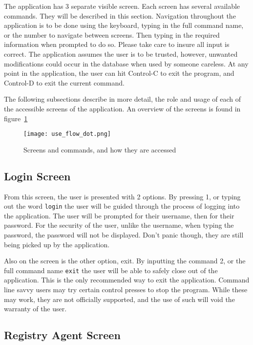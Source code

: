 The application has 3 separate visible screen. Each screen has several
available commands. They will be described in this section. Navigation
throughout the application is to be done using the keyboard, typing in the full
command name, or the number to navigate between screens. Then typing in the
required information when prompted to do so. Please take care to insure all
input is correct. The application assumes the user is to be trusted, however,
unwanted modifications could occur in the database when used by someone
careless. At any point in the application, the user can hit Control-C to exit
the program, and Control-D to exit the current command.

The following subsections describe in more detail, the role and usage of each
of the accessible screens of the application. An overview of the screens is found in figure~\ref{fig:use_flow}

\begin{figure}
    \centering
    \texttt{[image: use\_flow\_dot.png]}
    \caption{Screens and commands, and how they are accessed}\label{fig:use_flow}
\end{figure}

\subsection{Login Screen}

From this screen, the user is presented with 2 options. By pressing 1, or
typing out the word \verb|login| the user will be guided through the process of
logging into the application. The user will be prompted for their username,
then for their password. For the security of the user, unlike the username,
when typing the password, the password will not be displayed. Don't panic
though, they are still being picked up by the application.

Also on the screen is the other option, exit. By inputting the command 2, or
the full command name \verb|exit| the user will be able to safely close out of
the application. This is the only recommended way to exit the application.
Command line savvy users may try certain control presses to stop the program.
While these may work, they are not officially supported, and the use of such
will void the warranty of the user.

\subsection{Registry Agent Screen}


